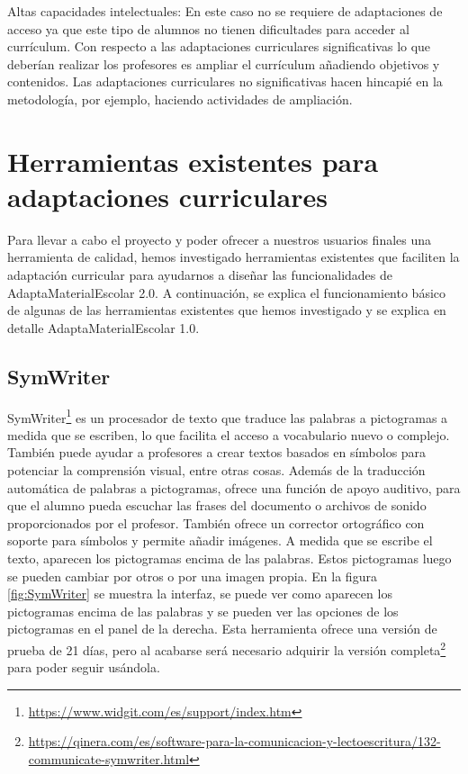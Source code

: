 Altas capacidades intelectuales: En este caso no se requiere de adaptaciones de acceso ya que  este tipo de alumnos no tienen dificultades para acceder al currículum. Con respecto a las adaptaciones curriculares significativas lo que deberían realizar los profesores es ampliar el currículum añadiendo objetivos y contenidos. Las adaptaciones curriculares no significativas hacen hincapié en la metodología, por ejemplo, haciendo actividades de ampliación.



\section{Herramientas existentes para adaptaciones curriculares}
\label{cap:herramientas}
Para llevar a cabo el proyecto y poder ofrecer a nuestros usuarios finales una herramienta de calidad, hemos investigado herramientas existentes que faciliten la adaptación curricular para ayudarnos a diseñar las funcionalidades de AdaptaMaterialEscolar 2.0. A continuación, se explica el funcionamiento básico de algunas de las herramientas existentes que hemos investigado y se explica en detalle AdaptaMaterialEscolar 1.0.

\subsection{SymWriter}
SymWriter\footnote{\url{https://www.widgit.com/es/support/index.htm}} es un procesador de texto que traduce las palabras a pictogramas a medida que se escriben, lo que facilita el acceso a vocabulario nuevo o complejo. También puede ayudar a profesores a crear textos basados en símbolos para potenciar la comprensión visual, entre otras cosas. Además de la traducción automática de palabras a pictogramas, ofrece una función de apoyo auditivo, para que el alumno pueda escuchar las frases del documento o archivos de sonido proporcionados por el profesor. También ofrece un corrector ortográfico con soporte para símbolos y permite añadir imágenes. A medida que se escribe el texto, aparecen los pictogramas encima de las palabras. Estos pictogramas luego se pueden cambiar por otros o por una imagen propia. En la figura \ref{fig:SymWriter} se muestra la interfaz, se puede ver como aparecen los pictogramas encima de las palabras y se pueden ver las opciones de los pictogramas en el panel de la derecha. Esta herramienta ofrece una versión de prueba de 21 días, pero al acabarse será necesario adquirir la versión completa\footnote{\url{https://qinera.com/es/software-para-la-comunicacion-y-lectoescritura/132-communicate-symwriter.html}} para poder seguir usándola.

